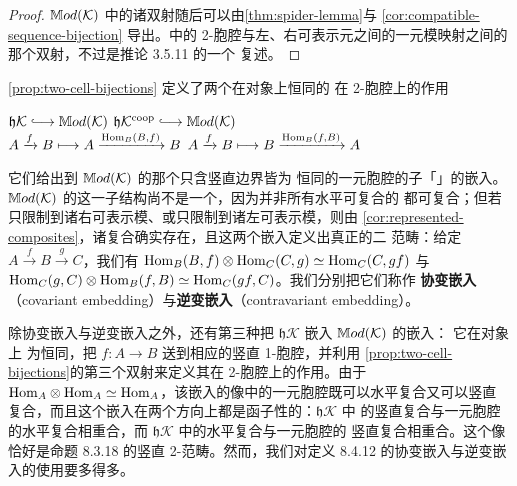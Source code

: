 \begin{proof}
$\mathbb{M}od(\mathcal{K})$ 中的诸双射随后可以由\cref{thm:spider-lemma}与%
\cref{cor:compatible-sequence-bijection} 导出。\trHomotopyTwoCategory{}中的
2-胞腔与左、右可表示元之间的一元模映射之间的那个双射，不过是推论 3.5.11 的一个
复述。
\end{proof}

\begin{definition}[协变嵌入与逆变嵌入]%
\label{def:covariant-contravariant-embeddings}
\cref{prop:two-cell-bijections} 定义了两个在对象上恒同的\trLocallyFullyFaithful{}%
\trHomomorphism{}在 2-胞腔上的作用
\begin{center}
$\mathfrak{h}\mathcal{K}\hooklongrightarrow\Mod(\mathcal{K})$
\qquad\qquad
$\mathfrak{h}\mathcal{K}^{\mathrm{coop}}\hooklongrightarrow\Mod(\mathcal{K})$
\\[0.6em]
$A\xrightarrow{f}B\longmapsto A\xrightarrow{\mathrm{Hom}_{B}(B,f)}B$
\qquad\qquad
$A\xrightarrow{f}B\longmapsto B\xrightarrow{\mathrm{Hom}_{B}(f,B)}A$
\end{center}
它们给出\trHomotopyTwoCategory{}到 $\mathbb{M}od(\mathcal{K})$ 的那个只含竖直边界皆为
恒同的一元胞腔的子「\trBicategory」的\trFullyFaithful{}嵌入。
$\mathbb{M}od(\mathcal{K})$ 的这一子结构尚不是一个\trBicategory，因为并非所有水平可复合的%
\trModule{}都可复合；但若只限制到诸右可表示模、或只限制到诸左可表示模，则由%
\cref{cor:represented-composites}，诸复合确实存在，且这两个嵌入定义出真正的二
范畴\trHomomorphism：给定 $A\xrightarrow{f}B\xrightarrow{g}C$，我们有
$\mathrm{Hom}_{B}(B,f)\otimes\mathrm{Hom}_{C}(C,g)\simeq\mathrm{Hom}_{C}(C,gf)$ 与
$\mathrm{Hom}_{C}(g,C)\otimes\mathrm{Hom}_{B}(f,B)\simeq\mathrm{Hom}_{C}(gf,C)$。我们分别把它们称作%
\textbf{协变嵌入}（covariant embedding）与\textbf{逆变嵌入}（contravariant
embedding）。
\end{definition}

\begin{remark}\label{rem:third-embedding}
除协变嵌入与逆变嵌入之外，还有第三种把\trHomotopyTwoCategory{}
$\mathfrak{h}\mathcal{K}$ 嵌入 $\mathbb{M}od(\mathcal{K})$ 的\trLocallyFullyFaithful{}嵌入：
它在对象上
为恒同，把 $f\colon A\to B$ 送到相应的竖直 1-胞腔，并利用%
\cref{prop:two-cell-bijections}的第三个双射来定义其在 2-胞腔上的作用。由于
$\mathrm{Hom}_{A}\otimes\mathrm{Hom}_{A}\simeq\mathrm{Hom}_{A}$，该嵌入的像中的一元胞腔既可以水平复合又可以竖直
复合，而且这个嵌入在两个方向上都是函子性的：$\mathfrak{h}\mathcal{K}$ 中%
\trNaturalTransformation{}的竖直复合与一元胞腔的水平复合相重合，而
$\mathfrak{h}\mathcal{K}$ 中\trNaturalTransformation{}的水平复合与一元胞腔的
竖直复合相重合。这个像恰好是命题 8.3.18 的竖直 2-范畴。然而，我们对定义 8.4.12
的协变嵌入与逆变嵌入的使用要多得多。
\end{remark}

